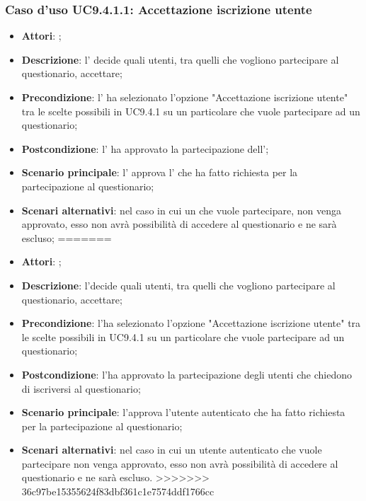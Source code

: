 			 \subsubsection{Caso d'uso UC9.4.1.1: Accettazione iscrizione utente}
			 \label{UC9.4.1.1}
			 \begin{itemize}
<<<<<<< HEAD
			 	\item \textbf{Attori}: \uaupro{};
			 	\item \textbf{Descrizione}: l'\uaupro{} decide quali utenti, tra quelli che vogliono partecipare al questionario, accettare; 
			 	\item \textbf{Precondizione}: l'\uaupro{} ha selezionato l'opzione "Accettazione iscrizione utente" tra le scelte possibili in UC9.4.1 su un particolare \uaupro{} che vuole partecipare ad un questionario;
			 	\item \textbf{Postcondizione}: l'\uaupro{} ha approvato la partecipazione dell'\uaupro{};
			 	\item \textbf{Scenario principale}: l'\uaupro{} approva l'\uaupro{} che ha fatto richiesta per la partecipazione al questionario; 
			 	\item \textbf{Scenari alternativi}: nel caso in cui un \uaupro{} che vuole partecipare, non venga approvato, esso non avrà possibilità di accedere al questionario e ne sarà escluso;
=======
			 	\item \textbf{Attori}: \uaupro;
			 	\item \textbf{Descrizione}: l'\uaupro decide quali utenti, tra quelli che vogliono partecipare al questionario, accettare; 
			 	\item \textbf{Precondizione}: l'\uaupro ha selezionato l'opzione "Accettazione iscrizione utente" tra le scelte possibili in UC9.4.1 su un particolare \uaupro che vuole partecipare ad un questionario;
			 	\item \textbf{Postcondizione}: l'\uaupro ha approvato la partecipazione degli utenti che chiedono di iscriversi al questionario;
			 	\item \textbf{Scenario principale}: l'\uaupro approva l'utente autenticato che ha fatto richiesta per la partecipazione al questionario; 
			 	\item \textbf{Scenari alternativi}: nel caso in cui un utente autenticato che vuole partecipare non venga approvato, esso non avrà possibilità di accedere al questionario e ne sarà escluso.
>>>>>>> 36c97be15355624f83dbf361c1e7574ddf1766cc
			 \end{itemize}
			
				